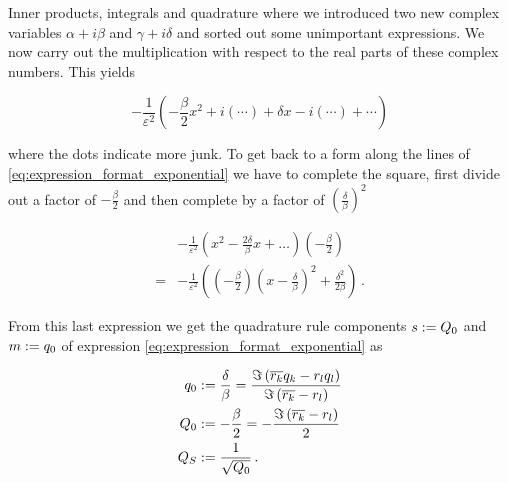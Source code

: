 \begin{chapter}{Inner products, integrals and quadrature}
where we introduced two new complex variables $\alpha + i \beta$ and $\gamma + i \delta$
and sorted out some unimportant expressions. We now carry out the multiplication
with respect to the real parts of these complex numbers. This yields

\begin{equation}
  -\frac{1}{\varepsilon^2} \left( -\frac{\beta}{2}x^2 + i \left(\cdots\right)
                                  + \delta x -i \left(\cdots\right)
                                  + \cdots
                          \right)
\end{equation}

where the dots indicate more junk. To get back to a form along the lines of
\eqref{eq:expression_format_exponential} we have to complete the square, first
divide out a factor of $-\frac{\beta}{2}$ and then complete by a factor of
$\left(\frac{\delta}{\beta}\right)^2$

\begin{equation}
\begin{split}
    & -\frac{1}{\varepsilon^2} \left( x^2 -\frac{2\delta}{\beta} x + \ldots \right) \left(-\frac{\beta}{2}\right) \\
  = & -\frac{1}{\varepsilon^2} \left( \left(-\frac{\beta}{2}\right) \left(x-\frac{\delta}{\beta}\right)^2 + \frac{\delta^2}{2\beta} \right) \,.
\end{split}
\end{equation}

From this last expression we get the quadrature rule components $s := Q_0$
and $m := q_0$ of expression \eqref{eq:expression_format_exponential} as

\begin{equation} \label{eq:inhomog_quad_params}
\begin{split}
  q_0 & := \frac{\delta}{\beta} = \frac{\Im \left(\overline{r_k}q_k-r_l q_l\right)}{\Im \left(\overline{r_k}-r_l\right)} \\
  Q_0 & := -\frac{\beta}{2} = -\frac{\Im \left(\overline{r_k}-r_l\right)}{2} \\
  Q_S & := \frac{1}{\sqrt{Q_0}} \,.
\end{split}
\end{equation}


\end{chapter}

